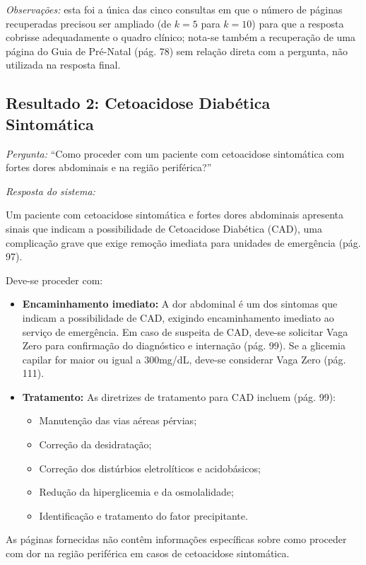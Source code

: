 \documentclass[conference,a4paper]{IEEEtran}
\begin{document}
\medskip
\noindent\textit{Observações:} esta foi a única das cinco
consultas em que o número de páginas recuperadas precisou ser
ampliado (de $k=5$ para $k=10$) para que a resposta cobrisse
adequadamente o quadro clínico; nota-se também a recuperação de
uma página do Guia de Pré-Natal (pág. 78) sem relação direta com
a pergunta, não utilizada na resposta final.

\subsection{Resultado 2: Cetoacidose Diabética Sintomática}

\noindent\textit{Pergunta:} ``Como proceder com um paciente com
cetoacidose sintomática com fortes dores abdominais e na região
periférica?''

\medskip
\noindent\textit{Resposta do sistema:}

Um paciente com cetoacidose sintomática e fortes dores abdominais
apresenta sinais que indicam a possibilidade de Cetoacidose
Diabética (CAD), uma complicação grave que exige remoção imediata
para unidades de emergência (pág. 97).

Deve-se proceder com:
\begin{itemize}
  \item \textbf{Encaminhamento imediato:} A dor abdominal é um
        dos sintomas que indicam a possibilidade de CAD, exigindo
        encaminhamento imediato ao serviço de emergência. Em caso
        de suspeita de CAD, deve-se solicitar Vaga Zero para
        confirmação do diagnóstico e internação (pág. 99). Se a
        glicemia capilar for maior ou igual a 300mg/dL, deve-se
        considerar Vaga Zero (pág. 111).
  \item \textbf{Tratamento:} As diretrizes de tratamento para CAD
        incluem (pág. 99):
  \begin{itemize}
    \item Manutenção das vias aéreas pérvias;
    \item Correção da desidratação;
    \item Correção dos distúrbios eletrolíticos e acidobásicos;
    \item Redução da hiperglicemia e da osmolalidade;
    \item Identificação e tratamento do fator precipitante.
  \end{itemize}
\end{itemize}

As páginas fornecidas não contêm informações específicas sobre
como proceder com dor na região periférica em casos de
cetoacidose sintomática.
\end{document}
